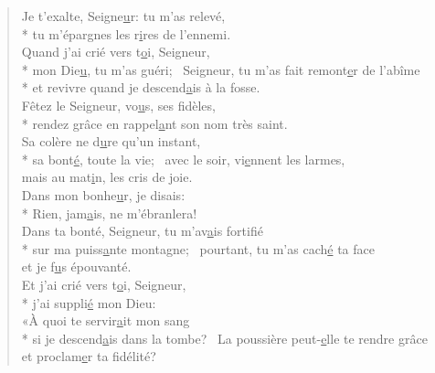 
\begin{verse}
Je t’exalte, Seigne\underline{u}r: tu m’as relevé, \\*
tu m’épargnes les r\underline{i}res de l’ennemi. \\

Quand j’ai crié vers t\underline{o}i, Seigneur, \\*
mon Die\underline{u}, tu m’as guéri;~\psalmstar
{}Seigneur, tu m’as fait remont\underline{e}r de l’abîme \\*
et revivre quand je descend\underline{a}is à la fosse. \\

Fêtez le Seigneur, vo\underline{u}s, ses fidèles, \\*
rendez grâce en rappel\underline{a}nt son nom très saint. \\

Sa colère ne d\underline{u}re qu’un instant, \\*
sa bont\underline{é}, toute la vie;~\psalmstar
avec le soir, vi\underline{e}nnent les larmes, \\
mais au mat\underline{i}n, les cris de joie. \\

Dans mon bonhe\underline{u}r, je disais: \\*
Rien, jam\underline{a}is, ne m’ébranlera! \\

Dans ta bonté, Seigneur, tu m’av\underline{a}is fortifié \\*
sur ma puiss\underline{a}nte montagne;~\psalmstar
pourtant, tu m’as cach\underline{é} ta face \\
et je f\underline{u}s épouvanté. \\

Et j’ai crié vers t\underline{o}i, Seigneur, \\*
j’ai suppli\underline{é} mon Dieu: \\

«À quoi te servir\underline{a}it mon sang \\*
si je descend\underline{a}is dans la tombe?~\psalmstar
La poussière peut-\underline{e}lle te rendre grâce \\
et proclam\underline{e}r ta fidélité? \\


\end{verse}

